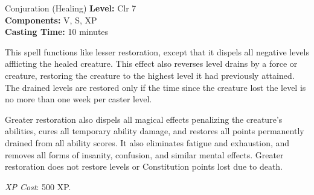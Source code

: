 {Conjuration (Healing)}
{
	\textbf{Level:}
	Clr 7\\
	\textbf{Components:}
	V, S, XP\\
	\textbf{Casting Time:}
	10 minutes\\
}
{
	This spell functions like lesser restoration, except that it dispels all negative levels afflicting the healed creature. This effect also reverses level drains by a force or creature, restoring the creature to the highest level it had previously attained. The drained levels are restored only if the time since the creature lost the level is no more than one week per caster level.

	Greater restoration also dispels all magical effects penalizing the creature's abilities, cures all temporary ability damage, and restores all points permanently drained from all ability scores. It also eliminates fatigue and exhaustion, and removes all forms of insanity, confusion, and similar mental effects. Greater restoration does not restore levels or Constitution points lost due to death.

	\textit{XP Cost}:
	500 XP.

}
